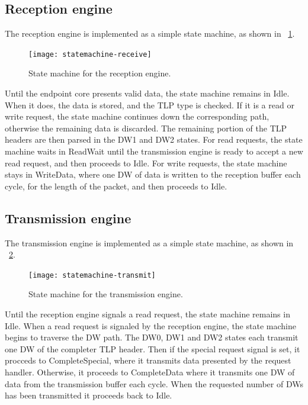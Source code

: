 \subsection{Reception engine}

The reception engine is implemented as a simple state machine, as shown in \figurename~\ref{fig:statemachine-receive}.

\begin{figure}[!ht]
    \centering
    \texttt{[image: statemachine-receive]}
    \caption[Reception engine state machine]{
        State machine for the reception engine.
    }
    \label{fig:statemachine-receive}
\end{figure}

Until the endpoint core presents valid data, the state machine remains in Idle.
When it does, the data is stored, and the TLP type is checked.
If it is a read or write request, the state machine continues down the corresponding path, otherwise the remaining data is discarded.
The remaining portion of the TLP headers are then parsed in the DW1 and DW2 states.
For read requests, the state machine waits in ReadWait until the transmission engine is ready to accept a new read request, and then proceeds to Idle.
For write requests, the state machine stays in WriteData, where one DW of data is written to the reception buffer each cycle, for the length of the packet, and then proceeds to Idle.

\subsection{Transmission engine}

The transmission engine is implemented as a simple state machine, as shown in \figurename~\ref{fig:statemachine-transmit}.

\begin{figure}[!ht]
    \centering
    \texttt{[image: statemachine-transmit]}
    \caption[Transmission engine state machine]{
        State machine for the transmission engine.
    }
    \label{fig:statemachine-transmit}
\end{figure}

Until the reception engine signals a read request, the state machine remains in Idle.
When a read request is signaled by the reception engine, the state machine begins to traverse the DW path.
The DW0, DW1 and DW2 states each transmit one DW of the completer TLP header.
Then if the special request signal is set, it procceds to CompleteSpecial, where it transmits data presented by the request handler.
Otherwise, it proceeds to CompleteData where it transmits one DW of data from the transmission buffer each cycle.
When the requested number of DWs has been transmitted it proceeds back to Idle.

